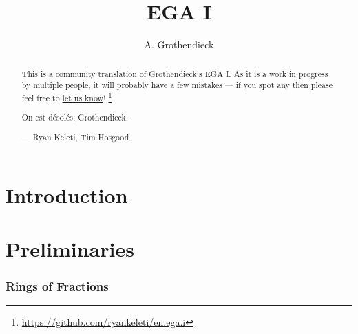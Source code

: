 \documentclass[10pt,oneside]{amsart}
\title{EGA I}
\author{A. Grothendieck}
\begin{document}
\renewcommand{\abstractname}{What this is}
\begin{abstract}
    This is a community translation of Grothendieck's EGA I.
    As it is a work in progress by multiple people, it will probably have a few mistakes --- if you spot any then please feel free to \href{https://github.com/ryankeleti/en.ega.i/issues}{let us know}!
    \thanks{\url{https://github.com/ryankeleti/en.ega.i}}
    
    On est désolés, Grothendieck.

    --- Ryan Keleti, Tim Hosgood
\end{abstract}

\maketitle

\noindent\hspace{0.15\linewidth}
    \tableofcontents{}


\clearpage


\part*{Introduction}



\clearpage


\setcounter{part}{-1}

\part{Preliminaries}

    \section{Rings of Fractions}
    \setcounter{subsection}{-1}

        

        

        

        

        

        
\end{document}
